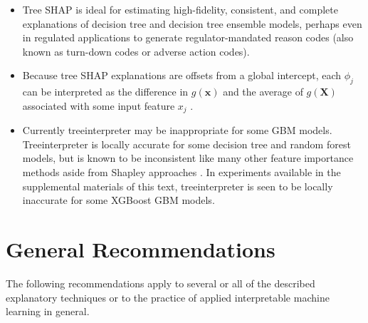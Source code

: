 \documentclass[sigconf]{acmart}
\begin{document}
\begin{itemize}
	
	\item Tree SHAP is ideal for estimating high-fidelity, consistent, and complete explanations of decision tree and decision tree ensemble models, perhaps even in regulated applications to generate regulator-mandated reason codes (also known as turn-down codes or adverse action codes).
	
	\item Because tree SHAP explanations are offsets from a global intercept, each $\phi_j$ can be interpreted as the difference in $g(\mathbf{x})$ and the average of $g(\mathbf{X})$ associated with some input feature $x_j$ \cite{molnar}. 
		
	\item Currently treeinterpreter may be inappropriate for some GBM models. Treeinterpreter is locally accurate for some decision tree and random forest models, but is known to be inconsistent like many other feature importance methods aside from Shapley approaches \cite{tree_shap}. In experiments available in the supplemental materials of this text, treeinterpreter is seen to be locally inaccurate for some XGBoost GBM models. 
	
\end{itemize}

\section{General Recommendations} \label{sec:gen_rec}

The following recommendations apply to several or all of the described explanatory techniques or to the practice of applied interpretable machine learning in general.
\end{document}
